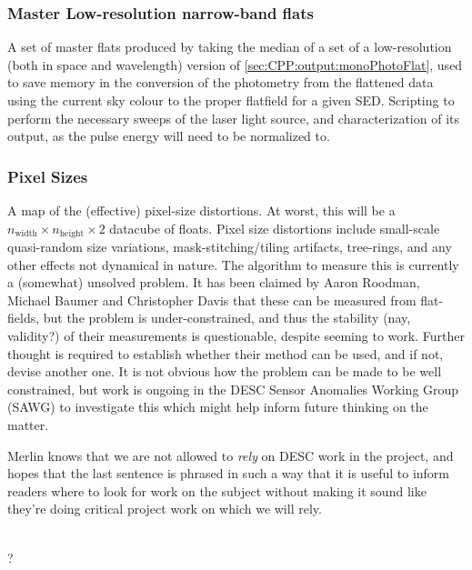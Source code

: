 \subsubsection{Master Low-resolution narrow-band flats}\label{sec:CPP:output:monoPhotoFlatLowRes}
A set of master flats produced by taking the median of a set of a low-resolution (both in space and wavelength) version of \secsymbol\ref{sec:CPP:output:monoPhotoFlat}, used to save memory in the conversion of the photometry from the flattened data using the current sky colour to the proper flatfield for a given SED.
\alg Scripting to perform the necessary sweeps of the laser light source, and characterization of its output, as the pulse energy will need to be normalized to.


\subsubsection{Pixel Sizes}\label{sec:CPP:output:pixelSizeMap}
A map of the (effective) pixel-size distortions. At worst, this will be a {$n_{\mbox{width}}\times n_{\mbox{height}}\times 2$} datacube of floats. Pixel size distortions include small-scale quasi-random size variations, mask-stitching/tiling artifacts, tree-rings, and any other effects not dynamical in nature.
\alg The algorithm to measure this is currently a (somewhat) unsolved problem. It has been claimed by Aaron Roodman, Michael Baumer and Christopher Davis that these can be measured from flat-fields, but the problem is under-constrained, and thus the stability (nay, validity?) of their measurements is questionable, despite seeming to work. Further thought is required to establish whether their method can be used, and if not, devise another one. It is not obvious how the problem can be made to be well constrained, but work is ongoing in the DESC Sensor Anomalies Working Group (SAWG) to investigate this which might help inform future thinking on the matter.
\begin{note}
	Merlin knows that we are not allowed to \emph{rely} on DESC work in the project, and hopes that the last sentence is phrased in such a way that it is useful to inform readers where to look for work on the subject without making it sound like they're doing critical project work on which we will rely.
\end{note}
\\ \dragons ?


